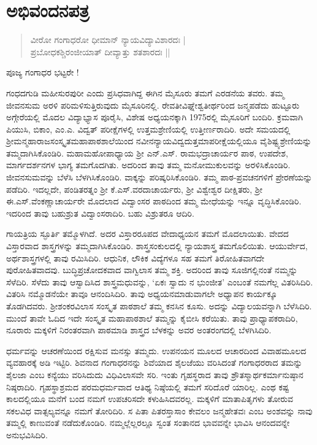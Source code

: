 \chapter{ಅಭಿವಂದನಪತ್ರ}

\begin{verse}
ವೀರೋ ಗಂಗಾಧರೋ ಧೀಮಾನ್ ನ್ಯಾಯವಿದ್ಯಾವಿಶಾರದಃ |\\
ಪ್ರಬೋಧಕಶ್ಚಿರಂಜೀಯಾತ್ ದೀವ್ಯಾತ್ತು ಶತಶಾರದಃ ||
\end{verse}

ಪೂಜ್ಯ ಗಂಗಾಧರ ಭಟ್ಟರೇ !

ಗಂಧದಗುಡಿ ಮಹೀಸುರಪುರೀ ಎಂದು ಪ್ರಸಿಧವಾಗಿದ್ದ ಈಗಿನ ಮೈಸೂರು ತಮಗೆ ಎರಡನೆಯ ತವರು. ತಮ್ಮ ಜೀವನಸುಮ ಅರಳಿ ಪರಿಮಳಿಸುತ್ತಿರುವುದು ಮೈಸೂರಿನಲ್ಲಿ. ರೇವತೀವಿಘ್ನೇಶ್ವತೀರ್ಥರಿಂದ ಜನ್ಮಪಡೆದು ಹುಟ್ಟೂರು ಅಗ್ಗೇರೆಯಲ್ಲಿ ಮೊದಲ ವಿದ್ಯಾಭ್ಯಾಸ ಪೂರೈಸಿ, ವಿಶೇಷ ಅಧ್ಯಯನಕ್ಕಾಗಿ 1975ರಲ್ಲಿ ಮೈಸೂರಿಗೆ ಬಂದಿರಿ. ಕ್ರಮವಾಗಿ ಪಿಯುಸಿ, ಬಿಕಾಂ, ಎಂ.ಎ. ವಿದ್ವತ್ ಪರೀಕ್ಷೆಗಳಲ್ಲಿ ಉತ್ತಮಶ್ರೇಣಿಯಲ್ಲಿ ಉತ್ತೀರ್ಣರಾದಿರಿ. ಅದೇ ಸಮಯದಲ್ಲಿ ಶ್ರೀಮನ್ಮಹಾರಾಜಸಂಸ್ಕೃತಮಹಾಪಾಠಶಾಲೆಯಿಂದ ನವೀನನ್ಯಾಯವಿದ್ವದುತ್ತಮಾಪರೀಕ್ಷೆಯಲ್ಲಿಯೂ ವೈಶಿಷ್ಟ್ಯಶ್ರೇಣಿಯನ್ನು ತಮ್ಮದಾಗಿಸಿಕೊಂಡಿರಿ. ಮಹಾಮಹೋಪಾಧ್ಯಾಯ ಶ್ರೀ ಎನ್.ಎಸ್. ರಾಮಭದ್ರಾಚಾರ್ಯರ ಪಾಠ, ಉಪದೇಶ, ಮಾರ್ಗದರ್ಶನಗಳ ಭಾಗ್ಯ ತಮಗೊದಗಿತು. ಅದರಿಂದ ತಾವು ತಮ್ಮ ಮನೋಮುಕುಲವನ್ನು ಅರಳಿಸಿಕೊಂಡಿರಿ. ಜೀವನಸುಮವನ್ನು ಬೆಳೆಸಿ ಬೆಳಗಿಸಿಕೊಂಡಿರಿ. ವಾಕ್ಕನ್ನು ಪರಿಷ್ಕರಿಸಿಕೊಂಡಿರಿ. ತಮ್ಮ ಪಾಠ-ಪ್ರವಚನಗಳಿಗೆ ಪ್ರೇರಣೆಯನ್ನು ಪಡೆದಿರಿ. ಇದಲ್ಲದೇ, ಪಂಡಿತರತ್ನಂ ಶ್ರೀ ಕೆ.ಎಸ್.ವರದಾಚಾರ್ಯರು, ಶ್ರೀ ವಿಶ್ವೇಶ್ವರ ದೀಕ್ಷಿತರು, ಶ್ರೀ ಈ.ಎಸ್.ವೆಂಕಣ್ಣಾಚಾರ್ಯರೇ ಮೊದಲಾದ ವಿದ್ವಾಂಸರ ಪಾಠದಿಂದ ತಮ್ಮ ಮೇಧೆಯನ್ನು ಇನ್ನೂ ವೃದ್ಧಿಸಿಕೊಂಡಿರಿ. ಇದರಿಂದ ತಾವು ಬಹುಶ್ರುತ ವಿದ್ವಾಂಸರಾದಿರಿ. ಬಹು ವಿಶ್ರುತರೂ ಆದಿರಿ.

ಗಾಯತ್ರಿಯ ಸ್ಫೂರ್ತಿ ತಮ್ಮೊಳಗಿದೆ. ಅದರ ವಿಸ್ತಾರರೂಪದ ವೇದಾಧ್ಯಯನ ತಮಗೆ ಮೊದಲಾಯಿತು. ವೇದದ ವಿಸ್ತಾರವಾದ ಶಾಸ್ತ್ರಗಳನ್ನು ತಮ್ಮದಾಗಿಸಿಕೊಂಡಿರಿ. ಶಾಸ್ತ್ರಸಂಕುಲದಲ್ಲಿ ನ್ಯಾಯಶಾಸ್ತ್ರ ತಮಗೊಲಿಯಿತು. ಆಯುರ್ವೇದ, ಅರ್ಥಶಾಸ್ತ್ರಗಳಲ್ಲಿ ತಾವು ರಮಿಸಿದಿರಿ. ಆಧುನಿಕ, ಲೌಕಿಕ ವಿದ್ಯೆಗಳೂ ಸಹ ತಮಗೆ ತಿರೋಹಿತವಾಗದೇ ಪುರೋಹಿತವಾದವು. ಬುದ್ಧಿಪ್ರಚೋದಕವಾದ ವಾಗ್ವಿಲಾಸ ತಮ್ಮ ಶಕ್ತಿ. ಅದರಿಂದ ತಾವು ಸೂಜಿಗಲ್ಲಿನಂತೆ ನಮ್ಮನ್ನು ಸೆಳೆದಿರಿ. ಸೆಳೆದು ತಾವು ಆಸ್ವಾದಿಸಿದ ಶಾಸ್ತ್ರಮಧುವನ್ನು,  `ಏಕಃ ಸ್ವಾದು ನ ಭುಂಜೀತ’ ಎಂಬಂತೆ ನಮಗೆಲ್ಲ ವಿತರಿಸಿದಿರಿ. ವಿತರಿಸಿ ನಮ್ಮೊಡನೆಯೇ ತಾವೂ ಆನಂದಿಸಿದಿರಿ. ತಾವು ಅಧ್ಯಯನಮಾಡುವಾಗಲೇ ಅಧ್ಯಾಪನ ಕಾರ್ಯಕ್ಕೂ ತೊಡಗಿದವರು. ಶ್ರೀಶಂಕರವಿಲಾಸ ಸಂಸ್ಕೃತ ಪಾಠಶಾಲೆ ತಮ್ಮ ಕನಸಿನ ಕೂಸು. ಅದನ್ನು ವಿದ್ಯಾಲಯವನ್ನಾಗಿ ಬೆಳೆಸಿದಿರಿ. ಮುಂದೆ ತಾವೇ ಓದಿದ ಇದೇ ಸಂಸ್ಕೃತ ಮಹಾಪಾಠಶಾಲೆ ತಮ್ಮನ್ನು ಕೈಬೀಸಿ ಕರೆಯಿತು. ತಾವು ಪ್ರಾಧ್ಯಾಪಕರಾದಿರಿ, ನೂರಾರು ಮಕ್ಕಳಿಗೆ ನಿರಂತರವಾಗಿ ಪಾಠಮಾಡಿ ಶಾಸ್ತ್ರದ ಬೆಳಕನ್ನು ಅವರ ಅಂತರಂಗದಲ್ಲಿ ಬೆಳಗಿಸಿದಿರಿ. 

ಧರ್ಮವನ್ನು ಆಚರಣೆಯಿಂದ ರಕ್ಷಿಸುವ ಮನಸ್ಸು ತಮ್ಮದು. ಉಪನಯನ ಮೂಲದ ಆಚಾರದಿಂದ ವಿವಾಹಮೂಲದ ವ್ಯವಹಾರಕ್ಕೆ ಅಡಿ ಇಟ್ಟಿರಿ. ಶಿವನಾದ ಗಂಗಾಧರನನ್ನು ಶಿವೆಯಾದ ಶೈಲಜೆಯು ವರಿಸಿದಂತೆ ಗಂಗಾಧರರಾದ ತಮನ್ನು ಶೈಲಜಾ ಎಂಬ ಕನ್ಯೆಯು ವರಿಸಿದುದು ವಿಧಿವಿಲಾಸವೇ ಸರಿ. ಇಂತು ಗೃಹಸ್ಥರಾದ ತಾವು ಶ್ರೌತಸ್ಮಾರ್ಥಕರ್ಮಾನುಷ್ಠಾನ ನಿಷ್ಠರಾದಿರಿ. ಗೃಹಸ್ಥಾಶ್ರಮದ ಪರಮಧರ್ಮವಾದ ಆತಿಥ್ಯ ನಿಷ್ಠೆಯಲ್ಲಿ ತಮಗೆ ಸರಿದೊರೆ ಯಾರಿಲ್ಲ. ಎಂಥ ಕಷ್ಟ ಕಾಲದಲ್ಲಿಯೂ ಮನೆಗೆ ಬಂದ ನಮಗೆ ಉಪಚರಿಸದೇ ಕಳುಹಿಸಿದವರಲ್ಲ. ಮಕ್ಕಳಿಗೆ ಮಾತಾಪಿತೃಗಳು ತೋರುವ ಸಕಲವಿಧ ವಾತ್ಸಲ್ಯವನ್ನೂ ನಮಗೆ ತೋರಿದಿರಿ. ಸ ಪಿತಾ ಪಿತರಸ್ತಾಸಾಂ ಕೇವಲಂ ಜನ್ಮಹೇತವಃ ಎಂಬ ಅಂಶವನ್ನು ನಾವು ತಮ್ಮಲ್ಲಿ ಕಾಣುವಂತೆ ನಡೆದುಕೊಂಡಿರಿ. ನಮ್ಮಲ್ಲೆಲ್ಲರಲ್ಲೂ ಸ್ವಂತ ಸಂತಾನದ ಭಾವವನ್ನೇ ಭಾವಿಸಿ ಆನಂದವನ್ನೇ ಅನುಭವಿಸಿದಿರಿ. 

